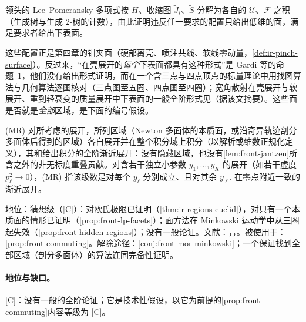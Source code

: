 \begin{proofsketch}
领头的 Lee--Pomeransky 多项式按 $H$、收缩图 $\tilde J_i$、$\tilde S$ 分解为各自的 $\mathcal U$、$\mathcal F$ 之积（生成树与生成 2-树的计数），由此证明违反任一要求的配置只给出低维的面，满足要求者给出下表面\cite[定理~2，附录~C]{Gardi:2022khw}。
\end{proofsketch}

\noindent 这些配置正是第四章的钳夹面（硬部离壳、喷注共线、软线零动量，\cref{def:ir-pinch-surface}）。反过来，“在壳展开的\emph{每个}下表面都具有这种形式”是 Gardi 等的命题~1，他们没有给出形式证明，而在一个含三点与四点顶点的标量理论中用找图算法与几何算法逐图核对（三点图至五圈、四点图至四圈）；宽角散射在壳展开与软展开、重到轻衰变的质量展开中下表面的一般全阶形式见\cite{Ma:2023hrt}（据该文摘要）。这些面是否就是\emph{全部}区域，是下面的编号假设。

\begin{assumption}\label{asm:front-mor-complete}
(MR) 对所考虑的展开，所列区域（Newton 多面体的本质面，或沿奇异轨迹剖分多面体后得到的区域）各自展开并在整个积分域上积分（以解析或维数正规化定义），其和给出积分的全阶渐近展开：没有隐藏区域，也没有\cref{lem:front-jantzen}所含之外的非无标度重叠贡献。对含若干独立小参数 $y_1,\dots,y_K$ 的展开（如若干虚度 $p_\ell^2\to0$），(MR) 指该级数是对每个 $y_\ell$ 分别成立、且对其余 $y_{\ell'}$ 在零点附近一致的渐近展开。

地位：猜想级（[C]）：对欧氏极限已证明（\cref{thm:ir-regions-euclid}），对只有一个本质面的情形已证明（\cref{prop:front-lp-facets}）；面方法在 Minkowski 运动学中从三圈起失效（\cref{prop:front-hidden-regions}）；没有一般论证。文献：\cite{Semenova:2018cwy}，\cite[第~6~节]{Gardi:2022khw}，\cite{Gardi:2024axt,Jantzen2011}。被使用于：\cref{prop:front-commuting}。解除途径：\cref{conj:front-mor-minkowski}；一个保证找到全部区域（剖分多面体）的算法连同完备性证明。
\end{assumption}

\paragraph{地位与缺口。}[C]：没有一般的全阶论证；它是技术性假设，以它为前提的\cref{prop:front-commuting}内容等级为 [C]。

